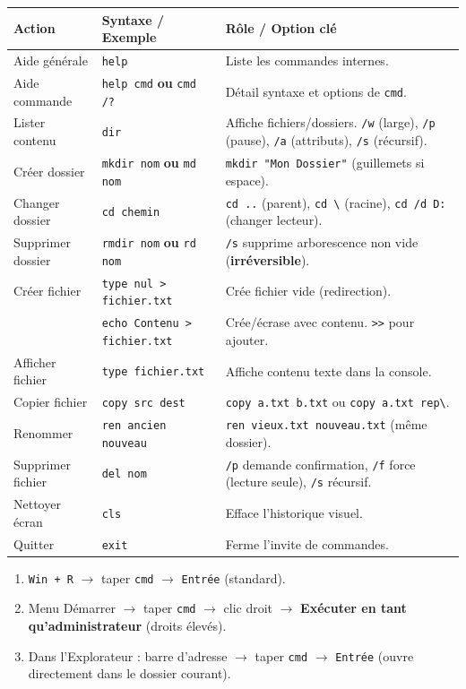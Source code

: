 \documentclass[11pt]{article}
\newcounter{popsec}
\newcounter{popsub}
\newcommand{\courssub}[1]{%
  \stepcounter{popsub}%
  \par\vspace{9pt}\noindent{\popxbold\fontsize{11.5}{13}\selectfont\color{popink}{\color{poporange}\thepopsec.\thepopsub}\hspace{6pt}#1}\par\nopagebreak\vspace{4pt}
}
\begin{document}
\begin{bilan}
\begin{center}
\begin{tabularx}{\linewidth}{|l|X|X|}
\hline
\rowcolor{popblueL}
\textbf{Action} & \textbf{Syntaxe / Exemple} & \textbf{Rôle / Option clé} \\
\hline
Aide générale & \texttt{help} & Liste les commandes internes. \\
Aide commande & \texttt{help cmd} \textbf{ou} \texttt{cmd /?} & Détail syntaxe et options de \texttt{cmd}. \\
\hline
Lister contenu & \texttt{dir} & Affiche fichiers/dossiers. \texttt{/w} (large), \texttt{/p} (pause), \texttt{/a} (attributs), \texttt{/s} (récursif). \\
Créer dossier & \texttt{mkdir nom} \textbf{ou} \texttt{md nom} & \texttt{mkdir "Mon Dossier"} (guillemets si espace). \\
Changer dossier & \texttt{cd chemin} & \texttt{cd ..} (parent), \texttt{cd \textbackslash} (racine), \texttt{cd /d D:} (changer lecteur). \\
Supprimer dossier & \texttt{rmdir nom} \textbf{ou} \texttt{rd nom} & \texttt{/s} supprime arborescence non vide (\textbf{irréversible}). \\
\hline
Créer fichier & \texttt{type nul > fichier.txt} & Crée fichier vide (redirection). \\
 & \texttt{echo Contenu > fichier.txt} & Crée/écrase avec contenu. \texttt{>>} pour ajouter. \\
Afficher fichier & \texttt{type fichier.txt} & Affiche contenu texte dans la console. \\
Copier fichier & \texttt{copy src dest} & \texttt{copy a.txt b.txt} ou \texttt{copy a.txt rep\textbackslash}. \\
\hline
Renommer & \texttt{ren ancien nouveau} & \texttt{ren vieux.txt nouveau.txt} (même dossier). \\
Supprimer fichier & \texttt{del nom} & \texttt{/p} demande confirmation, \texttt{/f} force (lecture seule), \texttt{/s} récursif. \\
\hline
Nettoyer écran & \texttt{cls} & Efface l'historique visuel. \\
Quitter & \texttt{exit} & Ferme l'invite de commandes. \\
\hline
\end{tabularx}
\end{center}

\courssub{Méthodes express}

\begin{methode}
\begin{enumerate}
    \item \texttt{Win + R} $\to$ taper \texttt{cmd} $\to$ \texttt{Entrée} (standard).
    \item Menu Démarrer $\to$ taper \texttt{cmd} $\to$ clic droit $\to$ \textbf{Exécuter en tant qu'administrateur} (droits élevés).
    \item Dans l'Explorateur : barre d'adresse $\to$ taper \texttt{cmd} $\to$ \texttt{Entrée} (ouvre directement dans le dossier courant).
\end{enumerate}
\end{methode}


\end{bilan}
\end{document}
